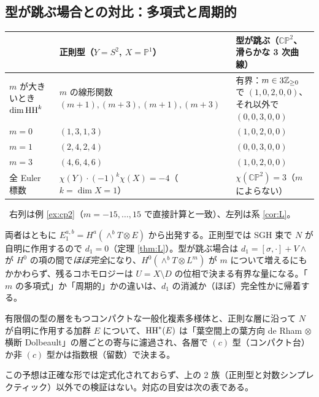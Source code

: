 \subsection{型が跳ぶ場合との対比：多項式と周期的}\label{subsec:contrast}
\begin{center}\small
\begin{tabular}{>{\raggedright\arraybackslash}p{3.4cm}>{\raggedright\arraybackslash}p{4.4cm}>{\raggedright\arraybackslash}p{5.8cm}}\toprule
 & 正則型（$Y=S^2$, $X=\mathbb P^1$） & 型が跳ぶ（$\mathbb{CP}^2$、滑らかな 3 次曲線）\\\midrule
$m$ が大きいとき $\dim\mathrm{HH}^k$ & $m$ の線形関数 $(m+1),(m+3),(m+1),(m+3)$ & 有界：$m\in3\mathbb Z_{\ge0}$ で $(1,0,2,0,0)$、それ以外で $(0,0,3,0,0)$\\\midrule
$m=0$ & $(1,3,1,3)$ & $(1,0,2,0,0)$\\\midrule
$m=1$ & $(2,4,2,4)$ & $(0,0,3,0,0)$\\\midrule
$m=3$ & $(4,6,4,6)$ & $(1,0,2,0,0)$\\\midrule
全 Euler 標数 & $\chi(Y)\cdot(-1)^{k}\chi(X)=-4$（$k=\dim X=1$） & $\chi(\mathbb{CP}^2)=3$（$m$ によらない）\\\bottomrule
\end{tabular}
\end{center}
\tV\ 右列は例 \ref{ex:cp2}（$m=-15,\dots,15$ で直接計算と一致）、左列は系 \ref{cor:L}。
\begin{obs}\tP\label{obs:contrast}
両者はともに $E_1^{a,b}=H^a(\wedge^bT\otimes E)$ から出発する。正則型では SGH 束で $N$ が自明に作用するので $d_1=0$（定理 \ref{thm:L}）。型が跳ぶ場合は $d_1=[\sigma,\cdot]+V\wedge$ が $H^0$ の項の間で\emph{ほぼ完全}になり、$H^0(\wedge^bT\otimes L^m)$ が $m$ について増えるにもかかわらず、残るコホモロジーは $U=X\setminus D$ の位相で決まる有界な量になる。「$m$ の多項式」か「周期的」かの違いは、$d_1$ の消滅か（ほぼ）完全性かに帰着する。
\end{obs}
\begin{conj}\tK\label{conj:U}
有限個の型の層をもつコンパクトな一般化複素多様体と、正則な層に沿って $N$ が自明に作用する加群 $E$ について、$\mathrm{HH}^*(E)$ は「葉空間上の葉方向 de Rham $\otimes$ 横断 Dolbeault」の層ごとの寄与に濾過され、各層で $(c)$ 型（コンパクト台）か非 $(c)$ 型かは指数根（留数）で決まる。
\end{conj}
\noindent この予想は正確な形では定式化されておらず、上の 2 族（正則型と対数シンプレクティック）以外での検証はない。対応の目安は次の表である。
